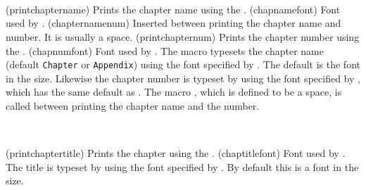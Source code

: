 \begin{syntax}
\cmd{\printchaptername} \cmd{\chapnamefont} \\
\cmd{\chapternamenum} \\
\cmd{\printchapternum} \cmd{\chapnumfont} \\
\end{syntax}
\glossary(printchaptername)%
  {}%
  {Prints the chapter name using the .}
\glossary(chapnamefont)%
  {}%
  {Font used by .}
\glossary(chapternamenum)%
  {}%
  {Inserted between printing the chapter name and number. 
   It is usually a space.}
\glossary(printchapternum)%
  {}%
  {Prints the chapter number using the .}
\glossary(chapnumfont)%
  {}%
  {Font used by .}
The macro \cmd{\printchaptername} typesets the chapter name 
(default \texttt{Chapter} or \texttt{Appendix}) using the font 
specified by \cmd{\chapnamefont}. The default is the \cmd{\bfseries} font in
the \cmd{\huge} size. Likewise the chapter number is typeset by 
\cmd{\printchapternum} using the font specified by \cmd{\chapnumfont}, 
which has the same default as \cmd{\chapnamefont}. The macro 
\cmd{\chapternamenum}, which is defined to be a space, is called between 
printing the chapter name and the number. 

\begin{syntax}
\cmd{\printchaptertitle} \cmd{\chaptitlefont} \\
\end{syntax}
\glossary(printchaptertitle)%
  {}%
  {Prints the chapter  using the .}
\glossary(chaptitlefont)%
  {}%
  {Font used by .}
The title is typeset by \cmd{\printchaptertitle} using the font specified 
by \cmd{\chaptitlefont}. 
By default this is a \cmd{\bfseries} font in the \cmd{\Huge} size. 

